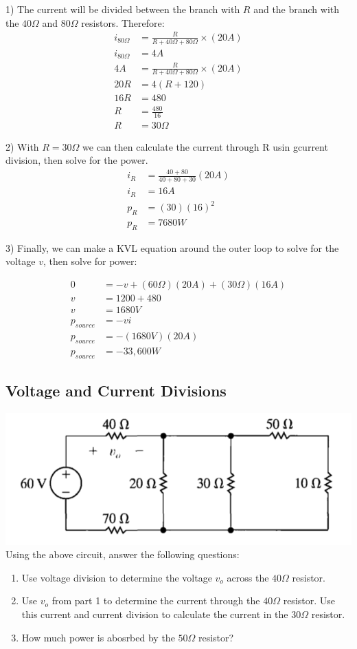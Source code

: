 1) The current will be divided between the branch with $R$ and the branch with the $40\Omega$ and
$80\Omega$ resistors. Therefore:
\begin{align*}
	i_{80\Omega} &= \frac{R}{R+40\Omega+80\Omega} \times (20A) \\
	i_{80\Omega} &= 4 A \\
	4 A &= \frac{R}{R+40\Omega+80\Omega} \times (20A) \\
	20R &= 4(R+120) \\
	16R &= 480 \\
	R &= \frac{480}{16} \\
	R &= 30\Omega
\end{align*}

2) With $R = 30\Omega$ we can then calculate the current through R usin gcurrent division, then
solve for the power. 
\begin{align*}
	i_R &= \frac{40+80}{40+80+30}(20 A) \\
	i_R &= 16 A \\
	p_R &= (30)(16)^2 \\
	p_R &= 7680 W
\end{align*}

3) Finally, we can make a KVL equation around the outer loop to solve for the voltage $v$, then solve for power:

\begin{align*}
	0 &= -v + (60 \Omega)(20 A) + (30 \Omega)(16 A) \\
	v &= 1200 + 480 \\
	v &= 1680 V \\
	p_{source} &= -vi \\
	p_{source} &= -(1680 V)(20 A) \\
	p_{source} &= -33,600 W
\end{align*}




\subsection{Voltage and Current Divisions}
\includegraphics[scale=0.5]{img/c3/p3}
Using the above circuit, answer the following questions:
\begin{enumerate}
	\item Use voltage division to determine the voltage $v_o$ across the $40 \Omega$ resistor.
	\item Use $v_o$ from part 1 to determine the current through the $40 \Omega$ resistor. Use
	this current and current division to calculate the current in the $30 \Omega$ resistor.
	\item How much power is abosrbed by the $50 \Omega$ resistor?
\end{enumerate}

